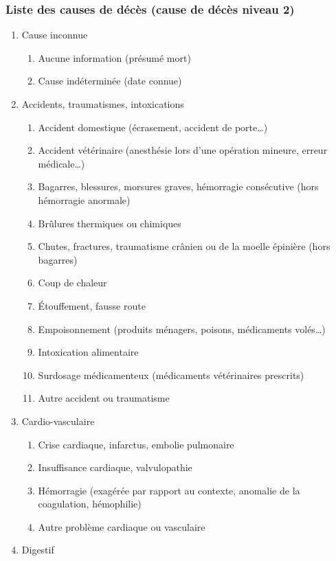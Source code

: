 ﻿\documentclass[a4paper,10pt]{article}
\begin{document}
\subsubsection{Liste des causes de décès (cause de décès niveau 2)}

\begin{enumerate}
\item Cause inconnue
\begin{enumerate}
\item Aucune information (présumé mort)
\item Cause indéterminée (date connue)
\end{enumerate}
\item Accidents, traumatismes, intoxications
\begin{enumerate}
\item Accident domestique (écrasement, accident de porte…)
\item Accident vétérinaire (anesthésie lors d’une opération mineure, erreur médicale…)
\item Bagarres, blessures, morsures graves, hémorragie consécutive (hors hémorragie anormale)
\item Brûlures thermiques ou chimiques
\item Chutes, fractures, traumatisme crânien ou de la moelle épinière (hors bagarres)
\item Coup de chaleur
\item Étouffement, fausse route
\item Empoisonnement (produits ménagers, poisons, médicaments volés…)
\item Intoxication alimentaire
\item Surdosage médicamenteux (médicaments vétérinaires prescrits)
\item Autre accident ou traumatisme
\end{enumerate}
\item Cardio-vasculaire
\begin{enumerate}
\item Crise cardiaque, infarctus, embolie pulmonaire
\item Insuffisance cardiaque, valvulopathie
\item Hémorragie (exagérée par rapport au contexte, anomalie de la coagulation, hémophilie)
\item Autre problème cardiaque ou vasculaire
\end{enumerate}
\item Digestif
\begin{enumerate}

\end{enumerate}
\end{enumerate}
\end{document}
